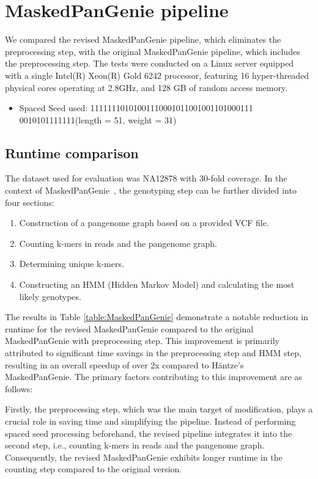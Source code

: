 \documentclass{PHlab-thesis}
\begin{document}
\section{MaskedPanGenie pipeline}
We compared the revised MaskedPanGenie pipeline, which eliminates the preprocessing step, with the original MaskedPanGenie pipeline, which includes the preprocessing step. The tests were conducted on a Linux server equipped with a single Intel(R) Xeon(R) Gold 6242 processor, featuring 16 hyper-threaded physical cores operating at 2.8GHz, and 128 GB of random access memory.
\begin{itemize}
    \item Spaced Seed used: 11111110101001110001011001001101000111\\0010101111111(length = 51, weight = 31)
\end{itemize}
\subsection{Runtime comparison}
The dataset used for evaluation was NA12878 with 30-fold coverage. In the context of MaskedPanGenie~\cite{haimo2023MaskedPanGenie}, the genotyping step can be further divided into four sections:
\begin{enumerate}[label=(\roman*)]
\item Construction of a pangenome graph based on a provided VCF file.
\item Counting k-mers in reads and the pangenome graph.
\item Determining unique k-mers.
\item Constructing an HMM (Hidden Markov Model) and calculating the most likely genotypes.
\end{enumerate}
The results in Table \ref{table:MaskedPanGenie} demonstrate a notable reduction in runtime for the revised MaskedPanGenie compared to the original MaskedPanGenie with preprocessing step. This improvement is primarily attributed to significant time savings in the preprocessing step and HMM step, resulting in an overall speedup of over 2x compared to Häntze's MaskedPanGenie. The primary factors contributing to this improvement are as follows:

Firstly, the preprocessing step, which was the main target of modification, plays a crucial role in saving time and simplifying the pipeline. Instead of performing spaced seed processing beforehand, the revised pipeline integrates it into the second step, i.e., counting k-mers in reads and the pangenome graph. Consequently, the revised MaskedPanGenie exhibits longer runtime in the counting step compared to the original version.
\end{document}

